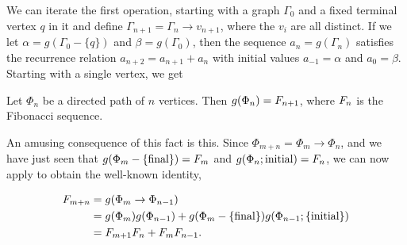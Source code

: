 We can iterate the first operation, starting with a graph $\Gamma_0$ and a fixed terminal vertex $q$ in it and define $\Gamma_{n + 1} = \Gamma_{n} \rightarrow v_{n + 1}$, where the $v_i$ are all distinct. If we let $\alpha = g(\Gamma_0 - \{q\})$ and $\beta = g(\Gamma_0)$, then the sequence $a_n = g(\Gamma_n)$ satisfies the recurrence relation $a_{n + 2} = a_{n + 1} + a_{n}$ with initial values $a_{-1} = \alpha$ and $a_0 = \beta$. Starting with a single vertex, we get

\begin{prop}
	Let $\Phi_n$ be a directed path of $n$ vertices. Then $g(\Phi_n) = F_{n + 1}$, where $F_{n}$ is the Fibonacci sequence.
\end{prop}

An amusing consequence of this fact is this. Since $\Phi_{m + n} = \Phi_m \rightarrow \Phi_n$, and we have just seen that $g(\Phi_m - \{\text{final}\}) = F_{m}$ and $g(\Phi_n; \text{initial}) = F_{n}$, 
we can now apply \hyperref[eustick]{} to obtain the well-known identity, \begin{enumrealm}
\begin{align*}
	F_{m + n} &= g(\Phi_m \rightarrow \Phi_{n - 1}) \\
	&= g(\Phi_m)g(\Phi_{n - 1}) + g(\Phi_m - \{\text{final}\})g(\Phi_{n - 1}; \{\text{initial}\}) \\
	&= F_{m + 1}F_{n} + F_{m}F_{n - 1}.
\end{align*}\end{enumrealm}
\vspace{-\baselineskip}
